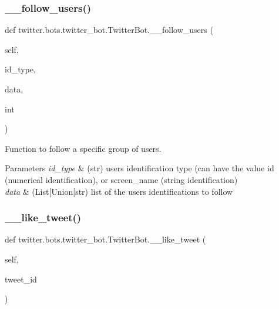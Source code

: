 \subsubsection{\texorpdfstring{\+\_\+\+\_\+follow\+\_\+users()}{\_\_follow\_users()}}
{\footnotesize\ttfamily def twitter.\+bots.\+twitter\+\_\+bot.\+Twitter\+Bot.\+\_\+\+\_\+follow\+\_\+users (\begin{DoxyParamCaption}\item[{}]{self,  }\item[{}]{id\+\_\+type,  }\item[{}]{data,  }\item[{}]{int }\end{DoxyParamCaption})\hspace{0.3cm}{\ttfamily [private]}}



Function to follow a specific group of users. 


\begin{DoxyParams}{Parameters}
{\em id\+\_\+type} & (str) user\textquotesingle{}s identification type (can have the value id (numerical identification), or screen\+\_\+name (string identification) \\
\hline
{\em data} & (List\mbox{[}Union\mbox{[}str) list of the user\textquotesingle{}s identifications to follow \\
\hline
\end{DoxyParams}
\mbox{\label{classtwitter_1_1bots_1_1twitter__bot_1_1TwitterBot_a27184061e80795ada1340fc80f630b64}} 
\subsubsection{\texorpdfstring{\+\_\+\+\_\+like\+\_\+tweet()}{\_\_like\_tweet()}}
{\footnotesize\ttfamily def twitter.\+bots.\+twitter\+\_\+bot.\+Twitter\+Bot.\+\_\+\+\_\+like\+\_\+tweet (\begin{DoxyParamCaption}\item[{}]{self,  }\item[{}]{tweet\+\_\+id }\end{DoxyParamCaption})\hspace{0.3cm}{\ttfamily [private]}}




